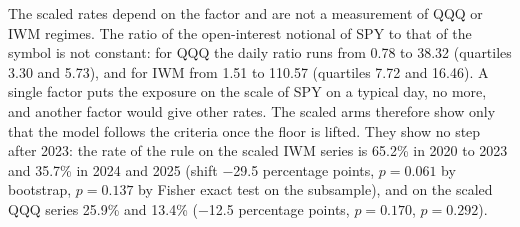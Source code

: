 The scaled rates depend on the factor and are not a measurement of QQQ or IWM regimes. The ratio of the open-interest notional of SPY to that of the symbol is not constant: for QQQ the daily ratio runs from 0.78 to 38.32 (quartiles 3.30 and 5.73), and for IWM from 1.51 to 110.57 (quartiles 7.72 and 16.46). A single factor puts the exposure on the scale of SPY on a typical day, no more, and another factor would give other rates. The scaled arms therefore show only that the model follows the criteria once the floor is lifted. They show no step after 2023: the rate of the rule on the scaled IWM series is 65.2\% in 2020 to 2023 and 35.7\% in 2024 and 2025 (shift $-$29.5 percentage points, $p=0.061$ by bootstrap, $p=0.137$ by Fisher exact test on the subsample), and on the scaled QQQ series 25.9\% and 13.4\% ($-$12.5 percentage points, $p=0.170$, $p=0.292$).

